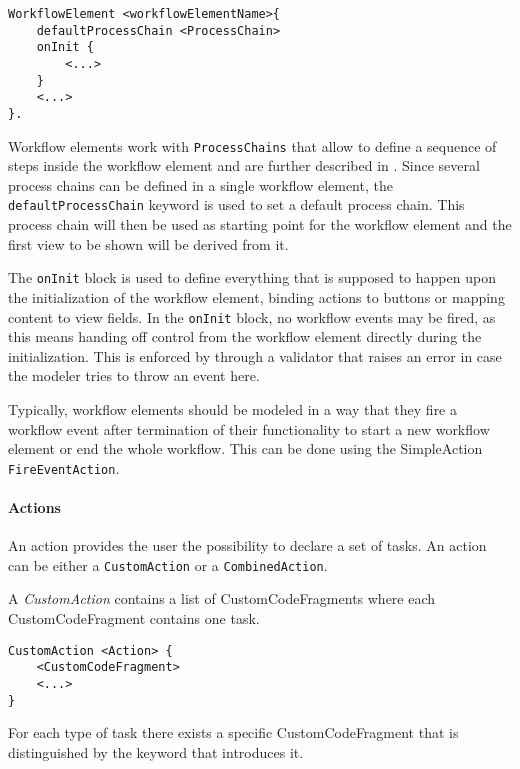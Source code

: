 \begin{lstlisting}
WorkflowElement <workflowElementName>{
	defaultProcessChain <ProcessChain>
	onInit {
		<...>
	}
	<...>
}.
\end{lstlisting}

Workflow elements work with \lstinline!ProcessChains! that allow to define a sequence of steps inside the workflow element and are further described in . Since several process chains can be defined in a single workflow element, the \lstinline!defaultProcessChain! keyword is used to set a default process chain. This process chain will then be used as starting point for the workflow element and the first view to be shown will be derived from it.

The \lstinline!onInit! block is used to define everything that is supposed to happen upon the initialization of the workflow element, \eg binding actions to buttons or mapping content to view fields. In the \lstinline!onInit! block, no workflow events may be fired, as this means handing off control from the workflow element directly during the initialization. This is enforced by through a validator that raises an error in case the modeler tries to throw an event here.

Typically, workflow elements should be modeled in a way that they fire a workflow event after termination of their functionality to start a new workflow element or end the whole workflow. This can be done using the SimpleAction \lstinline!FireEventAction!.

\paragraph{Actions}
An action provides the user the possibility to declare a set of tasks. An action can be either a \lstinline!CustomAction! or a \lstinline!CombinedAction!.

A \textit{CustomAction} contains a list of CustomCodeFragments where each CustomCodeFragment contains one task.

\begin{lstlisting}
CustomAction <Action> {
	<CustomCodeFragment>
	<...>
}
\end{lstlisting}

For each type of task there exists a specific CustomCodeFragment that is distinguished by the keyword that introduces it.


